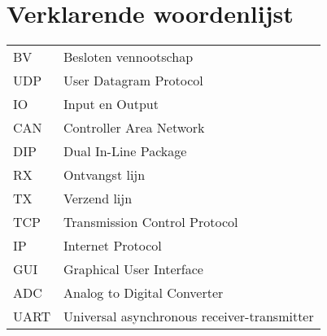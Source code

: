 \chapter{Verklarende woordenlijst}
\begin{table}[h!]
	\begin{tabular}{ll}
	BV	& Besloten vennootschap \\
	UDP & User Datagram Protocol \\
	IO	& Input en Output			\\
	CAN	& Controller Area Network \\
	DIP	& Dual In-Line Package \\
	RX	& Ontvangst lijn \\
	TX	& Verzend lijn \\
	TCP	& Transmission Control Protocol \\
	IP	& Internet Protocol \\
	GUI	& Graphical User Interface \\
	ADC	& Analog to Digital Converter \\
	UART & Universal asynchronous receiver-transmitter \\                  
	\end{tabular}
	\label{tab:woordenlijst}
\end{table}
